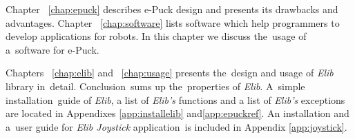   Chapter ~\ref{chap:epuck} describes e-Puck design and presents its drawbacks and advantages.
  Chapter ~\ref{chap:software} lists software which help programmers to develop applications for robots.
  In this chapter we discuss the~usage of a~software for e-Puck. 
  
  Chapters ~\ref{chap:elib} and ~\ref{chap:usage} presents the~design and usage of {\it Elib} library in~detail.
  Conclusion~sums up the~properties of {\it Elib}.
  A~simple installation~guide of {\it Elib}, a list of {\it Elib's} functions and a list of {\it Elib's} exceptions  are located in Appendixes \ref{app:installelib} and\ref{app:epuckref}.
  An installation and a~user guide for {\it Elib Joystick} application~is included in Appendix \ref{app:joystick}. 


